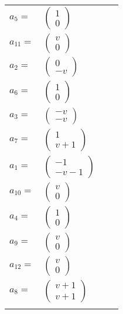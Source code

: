 \documentclass[1p]{elsarticle_modified}
\theoremstyle{definition}
\begin{document}
\begin{tabular}{m{7pt} m{180pt} m{7pt} m{180pt} }
\flushright $a_{5}=$&$\begin{pmatrix}1\\0\end{pmatrix}$ \\
\flushright $a_{11}=$&$\begin{pmatrix}v\\0\end{pmatrix}$ \\
\flushright $a_{2}=$&$\begin{pmatrix}0\\- v\end{pmatrix}$ \\
\flushright $a_{6}=$&$\begin{pmatrix}1\\0\end{pmatrix}$ \\
\flushright $a_{3}=$&$\begin{pmatrix}- v\\- v\end{pmatrix}$ \\
\flushright $a_{7}=$&$\begin{pmatrix}1\\v+1\end{pmatrix}$ \\
\flushright $a_{1}=$&$\begin{pmatrix}-1\\- v-1\end{pmatrix}$ \\
\flushright $a_{10}=$&$\begin{pmatrix}v\\0\end{pmatrix}$ \\
\flushright $a_{4}=$&$\begin{pmatrix}1\\0\end{pmatrix}$ \\
\flushright $a_{9}=$&$\begin{pmatrix}v\\0\end{pmatrix}$ \\
\flushright $a_{12}=$&$\begin{pmatrix}v\\0\end{pmatrix}$ \\
\flushright $a_{8}=$&$\begin{pmatrix}v+1\\v+1\end{pmatrix}$\\&\end{tabular}
\end{document}
